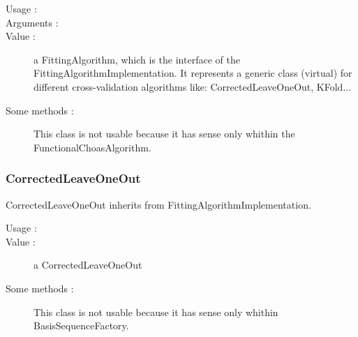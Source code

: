       \begin{description}
         \item[Usage :] \strut

         \item[Arguments :]  \strut

         \item[Value :]  a FittingAlgorithm, which is the interface of the FittingAlgorithmImplementation. It represents a generic class (virtual) for different cross-validation algorithms like: CorrectedLeaveOneOut, KFold...

         \item[Some methods :]  This class is not usable because it has sense only whithin the FunctionalChoasAlgorithm.

      \end{description}

\subsubsection{CorrectedLeaveOneOut}

      CorrectedLeaveOneOut inherits from FittingAlgorithmImplementation.

      \begin{description}
         \item[Usage :] \strut

         \item[Value :] a CorrectedLeaveOneOut

         \item[Some methods :] This class is not usable because it has sense only whithin BasisSequenceFactory.

      \end{description}

